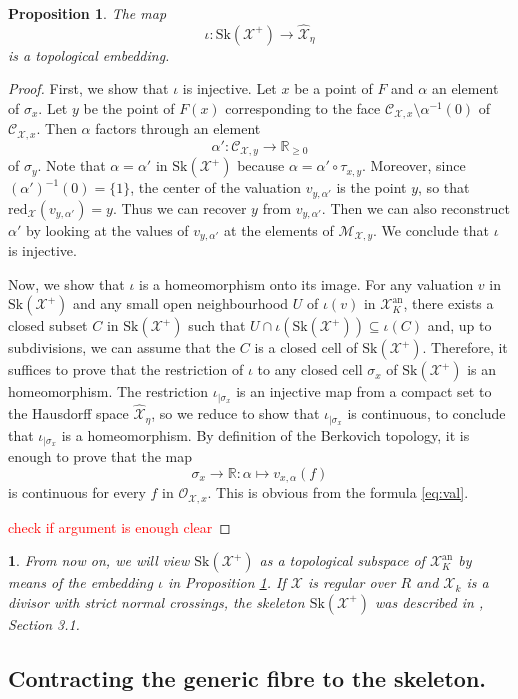 \documentclass{amsart}%
\numberwithin{equation}{subsection}
\theoremstyle{plain2}
\newtheorem{prop}[equation]{Proposition}
\theoremstyle{definition2}
\theoremstyle{stepstyle}
\theoremstyle{point}
\theoremstyle{subpoint}
\newtheorem{subpoint}[equation]{}%
\newcommand{\spa}[1]{\begin{subpoint}#1\end{subpoint}}           %
\newcommand{\R}{\ensuremath{\mathbb{R}}}
\newcommand{\cX}{\ensuremath{\mathscr{X}}}
\renewcommand{\R}{\ensuremath{\mathbb{R}}}
\newcommand{\redu}{\mathrm{red}}
\newcommand{\an}{\mathrm{an}}
\newcommand{\Sk}{\mathrm{Sk}}
\begin{document}
\begin{prop}\label{prop-embed}
The map $$\iota:\Sk(\cX^+)\to \widehat{\cX}_\eta$$  is a
topological embedding.
\end{prop}
\begin{proof}
First, we show that $\iota$ is injective. Let $x$ be a point of $F$ and $\alpha$ an element of $\sigma_x$. Let $y$ be the point of $F(x)$ corresponding to the face $\mathcal{C}_{\cX,x}\setminus
\alpha^{-1}(0)$ of $\mathcal{C}_{\cX,x}$. Then $\alpha$ factors through an element
$$\alpha':\mathcal{C}_{\cX,y}\to \R_{\geq 0}$$ of $\sigma_y$.  Note that $\alpha=\alpha'$ in $\Sk(\cX^+)$ because $\alpha=\alpha'\circ \tau_{x,y}$.
Moreover, since $(\alpha')^{-1}(0)=\{1\}$, the center of the valuation $v_{y,\alpha'}$ is the point $y$, so that $\redu_{\cX}(v_{y,\alpha'})=y$. Thus we can recover $y$ from $v_{y,\alpha'}$. Then we can also reconstruct $\alpha'$ by looking at the values of $v_{y,\alpha'}$ at the elements of $\mathcal{M}_{\cX,y}$. We conclude that $\iota$ is injective.

Now, we show that $\iota$ is a homeomorphism onto its image. For any valuation $v$ in $\Sk(\cX^+)$ and any small open neighbourhood $U$ of $\iota(v)$ in $\cX_K^\an$, there exists a closed subset $C$ in $\Sk(\cX^+)$ such that $U \cap \iota(\Sk(\cX^+))\subseteq \iota(C)$ and, up to subdivisions, we can assume that the $C$ is a closed cell of $\Sk(\cX^+)$. Therefore, it suffices to prove that the restriction of $\iota$ to any closed cell $\sigma_x$ of $\Sk(\cX^+)$ is an homeomorphism. The restriction $\iota_{|\sigma_x}$ is an injective map from a compact set to the Hausdorff space  $\widehat{\cX}_\eta$, so we reduce to show that $\iota_{|\sigma_x}$ is continuous, to conclude that $\iota_{|\sigma_x}$ is a homeomorphism. By definition of the Berkovich topology, it is enough to prove that the map $$\sigma_x\to \R:\alpha\mapsto v_{x,\alpha}(f)$$ is continuous for every $f$ in $\mathcal{O}_{\cX,x}$. This is obvious from the formula \eqref{eq:val}. 

\textcolor{red}{check if argument is enough clear}
\end{proof}

\spa{From now on, we will view $\Sk(\cX^+)$ as a topological subspace of $\cX_K^{\an}$ by means of the embedding $\iota$ in Proposition \ref{prop-embed}. If $\cX$ is regular over $R$ and $\cX_k$ is a divisor with strict normal crossings, the skeleton $\Sk(\cX^+)$ was described in \cite{MustataNicaise}, Section 3.1.}

\subsection{Contracting the generic fibre to the skeleton.}
\end{document}
